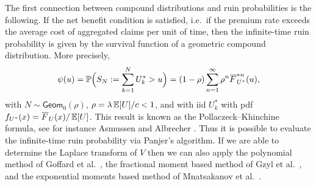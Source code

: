 The first connection between compound distributions and ruin probabilities is the following.
If the net benefit condition is satisfied, i.e.\ if the premium rate exceeds the average cost of aggregated claims per unit of time, then the infinite-time ruin probability is given by the survival function of a geometric compound distribution. More precisely,
\begin{equation*}\label{eq:PollaczeckKhinchineFormula}
\psi(u) = \Prob\Bigl(S_N \defeq \sum_{k=1}^{N}U^\ast_{k}>u\Bigr)
= (1 - \rho) \sum_{n=1}^\infty \rho^n \Ftail_{U^\ast}^{\ast n}(u),
\end{equation*}
with $N \sim \mathsf{Geom}_0(\rho)$, $\rho = \lambda\operatorname{{\mathbb E}}[U]/c<1$, and with iid $U^\ast_{k}$ with pdf $f_{U^\ast}(x)= \Ftail_U(x) / \Exp[U]$. This result is known as the Pollaczeck--Khinchine formula, see for instance Asmussen and Albrecher \cite[Chapter IV, (2.2)]{asmussen2010ruin}. Thus it is possible to evaluate the infinite-time ruin probability via Panjer's algorithm. If we are able to determine the Laplace transform of $V$ then we can also apply the polynomial method of Goffard et al.\ \cite{GoLoPo15}, the fractional moment based method of Gzyl et al.\ \cite{GzNITa13}, and the exponential moments based method of Mnatsakanov et al.\ \cite{Mnatsakanov2015}.

